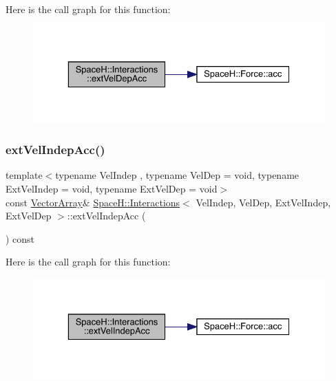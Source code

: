 Here is the call graph for this function\+:
\nopagebreak
\begin{figure}[H]
\begin{center}
\leavevmode
\includegraphics[width=329pt]{class_space_h_1_1_interactions_a9718af3e96323a7141f0c11e0d86b138_cgraph}
\end{center}
\end{figure}
\mbox{\label{class_space_h_1_1_interactions_a26c95f1540b9b0646d5d975ca1d3ca01}} 
\subsubsection{\texorpdfstring{ext\+Vel\+Indep\+Acc()}{extVelIndepAcc()}\hspace{0.1cm}{\footnotesize\ttfamily [1/2]}}
{\footnotesize\ttfamily template$<$typename Vel\+Indep , typename Vel\+Dep  = void, typename Ext\+Vel\+Indep  = void, typename Ext\+Vel\+Dep  = void$>$ \\
const \mbox{\hyperlink{class_space_h_1_1_interactions_ac9d9b24b469c4be73b96ce0f09f93fcf}{Vector\+Array}}\& \mbox{\hyperlink{class_space_h_1_1_interactions}{Space\+H\+::\+Interactions}}$<$ Vel\+Indep, Vel\+Dep, Ext\+Vel\+Indep, Ext\+Vel\+Dep $>$\+::ext\+Vel\+Indep\+Acc (\begin{DoxyParamCaption}{ }\end{DoxyParamCaption}) const\hspace{0.3cm}{\ttfamily [inline]}}

Here is the call graph for this function\+:
\nopagebreak
\begin{figure}[H]
\begin{center}
\leavevmode
\includegraphics[width=329pt]{class_space_h_1_1_interactions_a26c95f1540b9b0646d5d975ca1d3ca01_cgraph}
\end{center}
\end{figure}
\mbox{\label{class_space_h_1_1_interactions_ad2b05f1d0f50c5136aa5e437fd8e6226}} 
